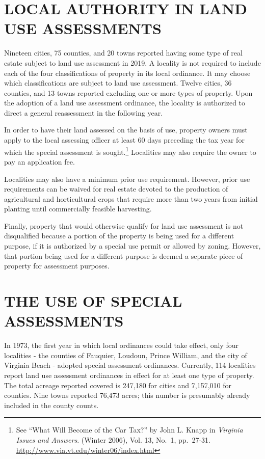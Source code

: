 \documentclass[
]{book}
\begin{document}
\hypertarget{local-authority-in-land-use-assessments}{%
\section{LOCAL AUTHORITY IN LAND USE ASSESSMENTS}\label{local-authority-in-land-use-assessments}}

Nineteen cities, 75 counties, and 20 towns reported having some type of real estate subject to land use assessment in 2019. A locality is not required to include each of the four classifications of property in its local ordinance. It may choose which classifications are subject to land use assessment. Twelve cities, 36 counties, and 13 towns reported excluding one or more types of property. Upon the adoption of a land use assessment ordinance, the locality is authorized to direct a general reassessment in the following year.

In order to have their land assessed on the basis of use, property owners must apply to the local assessing officer at least 60 days preceding the tax year for which the special assessment is sought.\footnote{See ``What Will Become of the Car Tax?'' by John L. Knapp in \emph{Virginia Issues and Answers}. (Winter 2006), Vol. 13, No.~1, pp.~27-31.
  \url{http://www.via.vt.edu/winter06/index.html}} Localities may also require the owner to pay an application fee.

Localities may also have a minimum prior use requirement. However, prior use requirements can be waived for real estate devoted to the production of agricultural and horticultural crops that require more than two years from initial planting until commercially feasible harvesting.

Finally, property that would otherwise qualify for land use assessment is not disqualified because a portion of the property is being used for a different purpose, if it is authorized by a special use permit or allowed by zoning. However, that portion being used for a different purpose is deemed a separate piece of property for assessment purposes.

\hypertarget{the-use-of-special-assessments}{%
\section{THE USE OF SPECIAL ASSESSMENTS}\label{the-use-of-special-assessments}}

In 1973, the first year in which local ordinances could take effect, only four localities - the counties of Fauquier, Loudoun, Prince William, and the city of Virginia Beach - adopted special assessment ordinances. Currently, 114 localities report land use assessment ordinances in effect for at least one type of property. The total acreage reported covered is 247,180 for cities and 7,157,010 for counties. Nine towns reported 76,473 acres; this number is presumably already included in the county counts.
\end{document}
